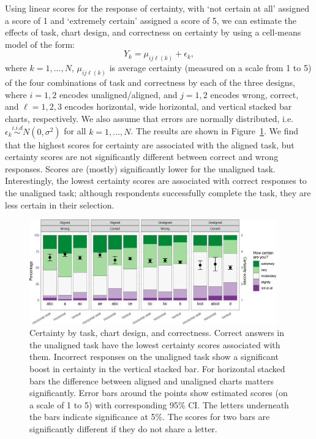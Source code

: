 \documentclass[
]{jds}
\begin{document}
Using linear scores for the response of certainty, with `not certain at
all' assigned a score of 1 and `extremely certain' assigned a score of
5, we can estimate the effects of task, chart design, and correctness on
certainty by using a cell-means model of the form: \begin{equation}
Y_{k} = \mu_{ij\ell(k)} + \epsilon_{k},
\end{equation} where \(k = 1, ..., N\), \(\mu_{ij\ell(k)}\) is average
certainty (measured on a scale from 1 to 5) of the four combinations of
task and correctness by each of the three designs, where \(i = 1, 2\)
encodes unaligned/aligned, and \(j=1,2\) encodes wrong, correct, and
\(\ell = 1, 2, 3\) encodes horizontal, wide horizontal, and vertical
stacked bar charts, respectively. We also assume that errors are
normally distributed,
i.e.~\(\epsilon_k \stackrel{i.i.d}{\sim} N(0, \sigma^2)\) for all
\(k = 1, ..., N\). The results are shown in Figure~\ref{fig-certainty}.
We find that the highest scores for certainty are associated with the
aligned task, but certainty scores are not significantly different
between correct and wrong responses. Scores are (mostly) significantly
lower for the unaligned task. Interestingly, the lowest certainty scores
are associated with correct responses to the unaligned task; although
respondents successfully complete the task, they are less certain in
their selection.

\begin{figure}[hbt]

{\centering \includegraphics[width=0.95\textwidth,height=\textheight]{./figures/fig-certainty-1.png}

}

\caption{\label{fig-certainty}Certainty by task, chart design, and
correctness. Correct answers in the unaligned task have the lowest
certainty scores associated with them. Incorrect responses on the
unaligned task show a significant boost in certainty in the vertical
stacked bar. For horizontal stacked bars the difference between aligned
and unaligned charts matters significantly. Error bars around the points
show estimated scores (on a scale of 1 to 5) with corresponding 95\% CI.
The letters underneath the bars indicate significance at 5\%. The scores
for two bars are significantly different if they do not share a letter.}

\end{figure}
\end{document}
